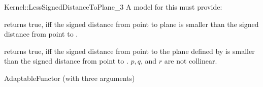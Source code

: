 \begin{ccRefFunctionObjectConcept}{Kernel::LessSignedDistanceToPlane_3}
A model for this must provide:


{returns true, iff the signed distance from point  to plane 
 is smaller than the signed distance from point  to .}

{returns true, iff the signed distance from point  to the plane
 defined by  is smaller than the signed distance 
from point  to .
\ccPrecond $p, q$, and $r$ are not collinear.}

\ccRefines
AdaptableFunctor (with three arguments)

\ccSeeAlso
{}\\

\end{ccRefFunctionObjectConcept}
